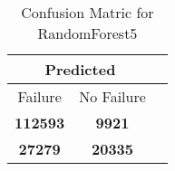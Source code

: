 \begin{table}[] 
\caption{Confusion Matric for RandomForest5} 
\label{Table: Prediction Accuracy-DMDRandomForest5OnlySunEKF-combinationReflectionEKF-top2-Reflection} 
\centering 
\begin{tabular} 
 {@{}ccc@{}} 
\toprule 
\multicolumn{2}{c}{\textbf{Predicted}}
 \\ \midrule 
\multicolumn{1}{|c|}{Failure} & 
\multicolumn{1}{c|}{No Failure}
 \\ \midrule 
\multicolumn{1}{|c|}{\color{green}\textbf{112593}} & 
\multicolumn{1}{c|}{\color{red}\textbf{9921}}
 \\ \midrule 
\multicolumn{1}{|c|}{\color{red}\textbf{27279}} & 
\multicolumn{1}{c|}{\color{green}\textbf{20335}}
 \\ \bottomrule 
\end{tabular} 
\end{table} 
